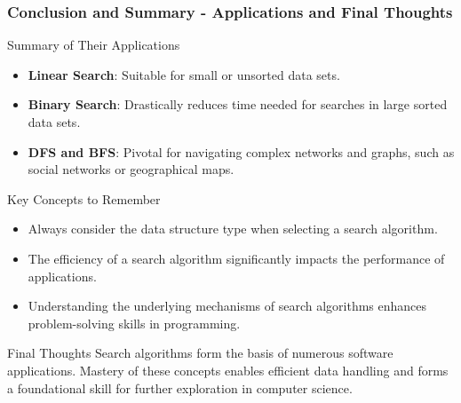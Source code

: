 \documentclass[aspectratio=169]{beamer}
\begin{document}
\begin{frame}[fragile]
    \frametitle{Conclusion and Summary - Applications and Final Thoughts}
    \begin{block}{Summary of Their Applications}
        \begin{itemize}
            \item \textbf{Linear Search}: Suitable for small or unsorted data sets.
            \item \textbf{Binary Search}: Drastically reduces time needed for searches in large sorted data sets.
            \item \textbf{DFS and BFS}: Pivotal for navigating complex networks and graphs, such as social networks or geographical maps.
        \end{itemize}
    \end{block}

    \begin{block}{Key Concepts to Remember}
        \begin{itemize}
            \item Always consider the data structure type when selecting a search algorithm.
            \item The efficiency of a search algorithm significantly impacts the performance of applications.
            \item Understanding the underlying mechanisms of search algorithms enhances problem-solving skills in programming.
        \end{itemize}
    \end{block}
    
    \begin{block}{Final Thoughts}
        Search algorithms form the basis of numerous software applications. Mastery of these concepts enables efficient data handling and forms a foundational skill for further exploration in computer science.
    \end{block}
\end{frame}
\end{document}
